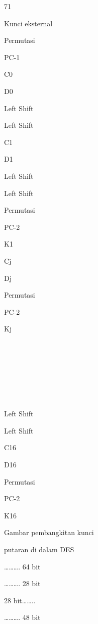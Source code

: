 \documentclass{article}
\begin{document}

71

Kunci eksternal

Permutasi

PC-1

C0

D0

Left Shift

Left Shift

C1

D1

Left Shift

Left Shift

Permutasi

PC-2

K1

Cj

Dj

Permutasi

PC-2

Kj









Left Shift

Left Shift

C16

D16

Permutasi

PC-2

K16

Gambar pembangkitan kunci 

putaran di dalam DES

………. 64 bit

………. 28 bit

28 bit……..

………. 48 bit
\end{document}
